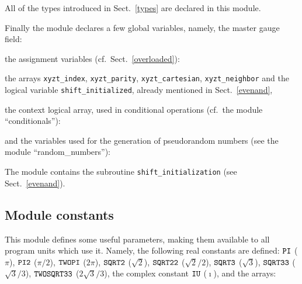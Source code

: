 All of the types introduced in Sect.~\ref{types} are declared in this module.

Finally the module declares a few global variables, namely, the master
gauge field:


{\parindent=0pt
the assignment variables (cf.~Sect.~\ref{overloaded}):}


{\parindent=0pt
the arrays {\tt xyzt\_index}, {\tt xyzt\_parity}, {\tt xyzt\_cartesian},
{\tt xyzt\_neighbor} and the logical variable {\tt shift\_initialized},
already mentioned in Sect.~\ref{evenand},}

{\parindent=0pt
the context logical array, used in conditional operations (cf.~the module
``conditionals''):}


{\parindent=0pt
and the variables used for the generation of pseudorandom numbers
(see the module ``random\_numbers''):}

  
{\parindent=0pt The module contains the subroutine {\tt shift\_initialization}
(see Sect.~\ref{evenand}).}

\subsection{Module constants}
\label{constants}

This module defines some useful parameters, making them available
to all program units which use it.  Namely, the following real constants
are defined: $\tt PI$ ($\pi$),   
$\tt PI2$ ($\pi/2$), $\tt TWOPI$ ($2 \pi$),   
$\tt SQRT2$ ($\sqrt{2}$), $\tt SQRT22$ ($\sqrt{2}/2$),   
$\tt SQRT3$ ($\sqrt{3}$), $\tt SQRT33$ ($\sqrt{3}/3$),   
$\tt TWOSQRT33$ ($2 \sqrt{3}/3$), the complex constant $\tt IU$
($\imath$), and the arrays:     





